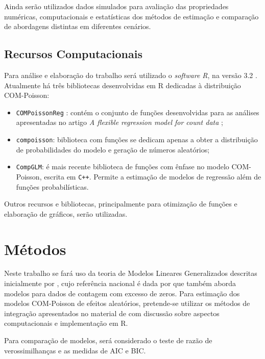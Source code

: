 \documentclass[
12pt,				%
openright,			%
oneside,			%
a4paper,			%
english,			%
brazil,				%
]{abntex2}
\begin{document}
Ainda serão utilizados dados simulados para avaliação das propriedades
numéricas, computacionais e estatísticas dos
métodos de estimação e comparação de abordagens distintas em diferentes
cenários.

\subsection{Recursos Computacionais}
\label{sec:recursos}

Para análise e elaboração do trabalho será utilizado o
\textit{software R}, na versão 3.2 \cite{Rcore2015}. 
Atualmente há três bibliotecas desenvolvidas em R dedicadas
à distribuição COM-Poisson:
\begin{itemize}
\item \texttt{COMPoissonReg} \cite{COMPoissonReg}: contém o conjunto de
  funções desenvolvidas para as análises apresentadas no artigo
  \textit{A flexible regression model for count data}
  \cite{Sellers2010};
\item \texttt{compoisson}: biblioteca com funções se dedicam apenas
  a obter a distribuição de probabilidades do modelo e geração de
  números aleatórios;
\item \texttt{CompGLM}: é mais recente biblioteca de funções com
  ênfase no modelo COM-Poisson, escrita em \texttt{C++}. Permite a
  estimação de modelos de regressão além de funções probabilísticas.
\end{itemize}

Outros recursos e bibliotecas, principalmente para 
otimização de funções e elaboração de gráficos, serão 
utilizadas.

\section{Métodos}
\label{sec:metodos}

Neste trabalho se fará uso da teoria de Modelos Lineares Generalizados
descritas inicialmente por , cujo referência
nacional é dada por  que também aborda modelos
para dados de contagem com excesso de zeros. Para estimação dos modelos
COM-Poisson de efeitos aleatórios, pretende-se utilizar os métodos de
integração apresentados no material de  com
discussão sobre aspectos computacionais e implementação em R.

Para comparação de modelos, será considerado o teste de razão de
verossimilhanças e as medidas de AIC e BIC.
\end{document}
